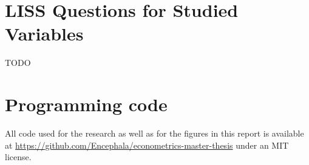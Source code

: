 \chapter{LISS Questions for Studied Variables}
\label{chap:app:liss_questions}
TODO

\chapter{Programming code}
All code used for the research as well as for the figures in this report is available at \url{https://github.com/Encephala/econometrics-master-thesis} under an MIT license.
